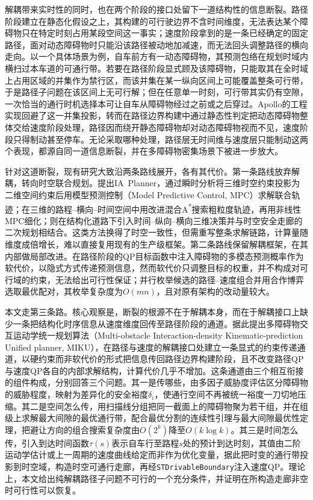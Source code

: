 \documentclass[a4paper,11pt]{ctexart}
\theoremstyle{definition}
\begin{document}
解耦带来实时性的同时，也在两个阶段的接口处留下一道结构性的信息断裂。路径阶段建立在静态化假设之上，其构建的可行驶边界不含时间维度，无法表达某个障碍物只在特定时刻占用某段空间这一事实；速度阶段拿到的是一条已经确定的固定路径，面对动态障碍物时只能沿该路径被动地加减速，而无法回头调整路径的横向走向。以一个具体场景为例，自车前方有一动态障碍物，其预测包络在规划时域内横扫过本车道的可通行带。若要在路径阶段显式顾及该障碍物，只能取其在全时域上占用区域的并集作为禁行区，而该并集在某一纵向区间上可能覆盖整条可行带，于是路径子问题在该区间上无可行解；但在任意单一时刻，可行带其实仍有空隙，一次恰当的通行时机选择本可让自车从障碍物经过之前或之后穿过。Apollo的工程实现回避了这一并集投影，转而在路径边界构建中通过静态性判定把动态障碍物整体交给速度阶段处理，路径因而绕开静态障碍物却对动态障碍物视而不见，速度阶段只得制动甚至停车。无论采取哪种处理，路径层无时间维与速度层只能制动这两个表现，都源自同一道信息断裂，并在多障碍物密集场景下被进一步放大\citep{gonzalez2016}。

针对这道断裂，现有研究大致沿两条路线展开，各有其代价。第一条路线放弃解耦，转向时空联合规划。\citet{yang2021_ia_planner}提出IA~Planner，通过瞬时分析将三维时空约束投影为二维空间约束后用模型预测控制（Model Predictive Control, MPC）求解联合轨迹；\citet{hu2023_hybrid_astar_slt}在三维的路程--横向--时间空间中用改进混合A\textsuperscript{*}搜索粗粒度轨迹，再用非线性MPC细化；\citet{qiao2025stjoint}则在结构化道路下引入时间--纵向--横向三维决策并与时空安全走廊的二次规划相结合。这类方法换得了时空一致性，但需重写整条求解链路，计算量随维度成倍增长，难以直接复用现有的生产级框架。第二条路线保留解耦框架，在其内部做局部改进。\citet{han2026_contingency}在路径阶段的QP目标函数中注入障碍物的多模态预测概率作为软代价，以隐式方式传递预测信息，然而软代价只调整目标的权重，并不构成对可行域的约束，无法给出可行性保证；\citet{zhang2023_dp_rcg}并行枚举候选的路径--速度组合并用合作博弈选取最优配对，其枚举复杂度为$O(mn)$，且对原有架构的改动量较大。

本文走第三条路。核心观察是，断裂的根源不在于解耦本身，而在于解耦接口上缺少一条把结构化时序信息从速度维度回传至路径阶段的通道。据此提出多障碍物交互运动学统一规划算法（Multi-obstacle Interaction-density Kinematic-prediction Unified planner, MIKU），在路径与速度的解耦接口处建立一条显式的约束传递通道，以硬约束而非软代价的形式把信息传回路径边界构建阶段，且不改变路径QP与速度QP各自的内部求解结构，计算代价几乎不增加。这条通道由三个相互衔接的组件构成，分别回答三个问题。其一是传哪些，由多因子威胁度评估区分障碍物的威胁程度，映射为差异化的安全裕度$\delta_i$，使通行空间不再被统一裕度一刀切地压缩。其二是空间怎么传，用扫描线分组把同一截面上的障碍物聚为若干组，并在组级上求解最大间隙的最优通行带，配合最优分割的连续性引理与最大间隙最优性定理，把避让方向的组合搜索复杂度由$O(2^k)$降至$O(k\log k)$。其三是时间怎么传，引入到达时间函数$\tau(s)$表示自车行至路程$s$处的预计到达时刻，其值由二阶运动学估计或上一周期的速度曲线给定而非作为优化变量，据此把时变的通行带投影到时空域，构造时空可通行走廊，再经\texttt{STDrivableBoundary}注入速度QP。理论上，本文给出纯解耦路径子问题不可行的一个充分条件，并证明在所构造走廊非空时可行性可以恢复。
\end{document}

